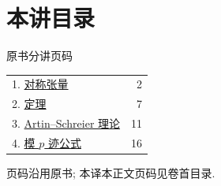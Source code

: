 \section*{本讲目录}
\begingroup\small
\noindent\hfill 原书分讲页码\par\smallskip
\begin{tabular}{@{}p{.87\linewidth}r@{}}
1. \hyperref[III:1]{对称张量} & 2\\
2. \hyperref[III:2]{定理} & 7\\
3. \hyperref[III:3]{Artin--Schreier 理论} & 11\\
4. \hyperref[III:4]{模 $p$ 迹公式} & 16
\end{tabular}
\par\medskip
\noindent 页码沿用原书; 本译本正文页码见卷首目录.
\endgroup
\clearpage
